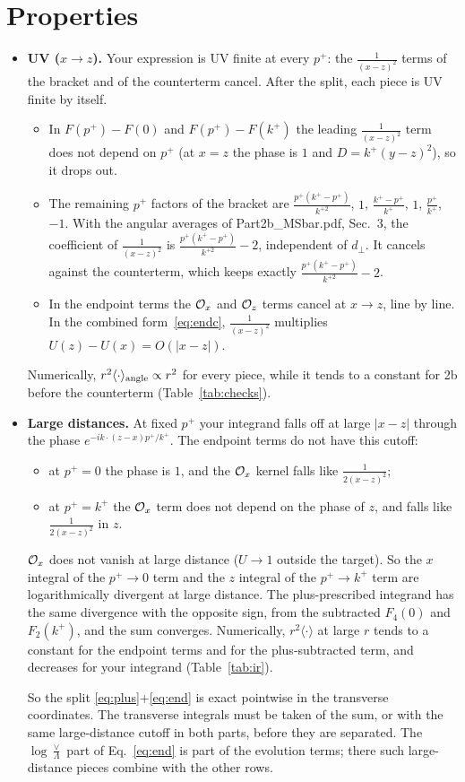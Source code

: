 \documentclass[10pt]{article}
\begin{document}
\section{Properties}\label{sec:prop}
\begin{itemize}
\item \textbf{UV ($x\to z$).} Your expression is UV finite at every $p^+$: the $\frac{1}{(x-z)^2}$ terms of the bracket and of the counterterm cancel. After the split, each piece is UV finite by itself.
\begin{itemize}
\item In $F(p^+)-F(0)$ and $F(p^+)-F(k^+)$ the leading $\frac{1}{(x-z)^2}$ term does not depend on $p^+$ (at $x=z$ the phase is $1$ and $D=k^+(y-z)^2$), so it drops out.
\item The remaining $p^+$ factors of the bracket are $\frac{p^+(k^+-p^+)}{k^{+2}}$, $1$, $\frac{k^+-p^+}{k^+}$, $1$, $\frac{p^+}{k^+}$, $-1$. With the angular averages of Part2b\_MSbar.pdf, Sec.~3, the coefficient of $\frac{1}{(x-z)^2}$ is $\frac{p^+(k^+-p^+)}{k^{+2}}-2$, independent of $d_\perp$. It cancels against the counterterm, which keeps exactly $\frac{p^+(k^+-p^+)}{k^{+2}}-2$.
\item In the endpoint terms the ${\cal O}_x$ and ${\cal O}_z$ terms cancel at $x\to z$, line by line. In the combined form~\eqref{eq:endc}, $\frac{1}{(x-z)^2}$ multiplies $U(z)-U(x)=O(|x-z|)$.
\end{itemize}
Numerically, $r^2\langle\cdot\rangle_{\rm angle}\propto r^2$ for every piece, while it tends to a constant for 2b before the counterterm (Table~\ref{tab:checks}).
\item \textbf{Large distances.} At fixed $p^+$ your integrand falls off at large $|x-z|$ through the phase $e^{-ik\cdot(z-x)p^+/k^+}$. The endpoint terms do not have this cutoff:
\begin{itemize}
\item at $p^+=0$ the phase is $1$, and the ${\cal O}_x$ kernel falls like $\frac{1}{2(x-z)^2}$;
\item at $p^+=k^+$ the ${\cal O}_x$ term does not depend on the phase of $z$, and falls like $\frac{1}{2(x-z)^2}$ in $z$.
\end{itemize}
${\cal O}_x$ does not vanish at large distance ($U\to1$ outside the target). So the $x$ integral of the $p^+\to0$ term and the $z$ integral of the $p^+\to k^+$ term are logarithmically divergent at large distance. The plus-prescribed integrand has the same divergence with the opposite sign, from the subtracted $F_4(0)$ and $F_2(k^+)$, and the sum converges. Numerically, $r^2\langle\cdot\rangle$ at large $r$ tends to a constant for the endpoint terms and for the plus-subtracted term, and decreases for your integrand (Table~\ref{tab:ir}).

So the split \eqref{eq:plus}+\eqref{eq:end} is exact pointwise in the transverse coordinates. The transverse integrals must be taken of the sum, or with the same large-distance cutoff in both parts, before they are separated. The $\log\frac{\vee}{\Lambda}$ part of Eq.~\eqref{eq:end} is part of the evolution terms; there such large-distance pieces combine with the other rows.
\end{itemize}
\end{document}

